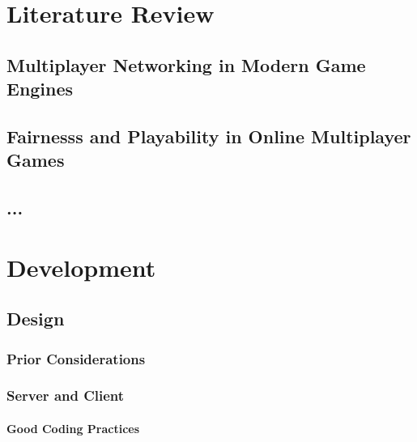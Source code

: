 \documentclass[bsc,frontabs,twoside,singlespacing,parskip,deptreport]{infthesis}     %
\begin{document}
\chapter{Literature Review}

\section{Multiplayer Networking in Modern Game Engines}

\section{Fairnesss and Playability in Online Multiplayer Games}

\section{...}





\chapter{Development}
\section{Design}
\subsection{Prior Considerations}
\subsection{Server and Client}
\subsubsection{Good Coding Practices}
\end{document}
